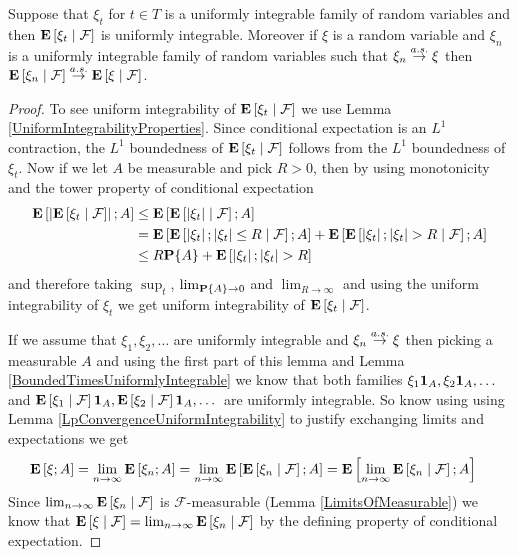 \begin{lem}Suppose that $\xi_t$ for $t \in T$ is a uniformly
  integrable family of random variables and then
  $\cexpectationlong{\mathcal{F}}{\xi_t}$ is uniformly integrable.
  Moreover if $\xi$ is a random variable and $\xi_n$ is a uniformly integrable family of random
  variables such that $\xi_n \toas \xi$ then
  $\cexpectationlong{\mathcal{F}}{\xi_n} \toas \cexpectationlong{\mathcal{F}}{\xi}$.
\end{lem}
\begin{proof}
To see uniform integrability of
$\cexpectationlong{\mathcal{F}}{\xi_t}$ we use Lemma
\ref{UniformIntegrabilityProperties}.  Since conditional expectation
is an $L^1$ contraction, the $L^1$ boundedness of
$\cexpectationlong{\mathcal{F}}{\xi_t}$ follows from the $L^1$
boundedness of $\xi_t$.  Now if we let $A$ be measurable and pick $R >
0$, then by using monotonicity and the tower property of conditional expectation 
\begin{align*}
\expectation{\abs{\cexpectationlong{\mathcal{F}}{\xi_t}} ; A} &\leq
\expectation{\cexpectationlong{\mathcal{F}}{\abs{\xi_t}} ; A} \\
&=\expectation{\cexpectationlong{\mathcal{F}}{\abs{\xi_t}; \abs{\xi_t}
  \leq R} ; A} +
\expectation{\cexpectationlong{\mathcal{F}}{\abs{\xi_t}; \abs{\xi_t} >
  R} ; A} \\
&\leq R \probability{A} + \expectation{\abs{\xi_t} ; \abs{\xi_t} > R} \\
\end{align*}
and therefore taking $\sup_t$, $\lim_{\probability{A} \to 0}$ and
$\lim_{R \to \infty}$ and using the uniform integrability of $\xi_t$
we get uniform integrability of
$\cexpectationlong{\mathcal{F}}{\xi_t}$.

If we assume that $\xi_1, \xi_2, \dotsc$ are uniformly integrable and $\xi_n \toas
\xi$ then picking a measurable $A$ and using the first part of this
lemma and Lemma \ref{BoundedTimesUniformlyIntegrable} we know that
both families $\xi_1
\characteristic{A}, \xi_2 \characteristic{A}, \dotsc$ and $\cexpectationlong{\mathcal{F}}{\xi_1}
\characteristic{A}, \cexpectationlong{\mathcal{F}}{\xi_2}
\characteristic{A}, \dotsc$ are uniformly integrable.  So know using
using Lemma \ref{LpConvergenceUniformIntegrability} to justify
exchanging limits and expectations we get
\begin{align*}
\expectation{\xi ; A} &= \lim_{n \to \infty} \expectation{\xi_n ; A} =
\lim_{n \to \infty} \expectation{\cexpectationlong{\mathcal{F}}{\xi_n}
  ; A} = \expectation{\lim_{n \to \infty} \cexpectationlong{\mathcal{F}}{\xi_n}
  ; A} 
\end{align*}
Since $\lim_{n \to \infty} \cexpectationlong{\mathcal{F}}{\xi_n}$
is $\mathcal{F}$-measurable (Lemma \ref{LimitsOfMeasurable}) we know that 
$\cexpectationlong{\mathcal{F}}{\xi} = \lim_{n \to \infty}
\cexpectationlong{\mathcal{F}}{\xi_n}$ by the defining property of conditional expectation.
\end{proof}
 
